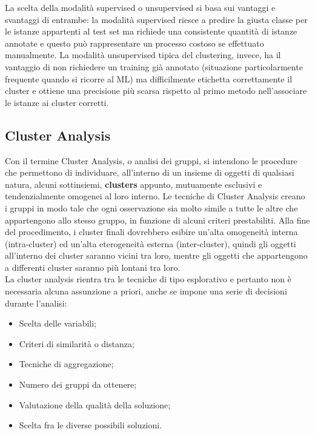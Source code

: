 La scelta della modalità supervised o unsupervised si basa sui vantaggi e svantaggi di entrambe: la modalità supervised riesce a predire la giusta classe per le istanze appartenti al test set ma richiede una consistente quantità di istanze annotate e questo può rappresentare un processo costoso se effettuato manualmente. La modalità unsupervised tipica del clustering, invece, ha il vantaggio di non richiedere un training già annotato (situazione particolarmente frequente quando si
ricorre al ML) ma difficilmente etichetta correttamente il cluster e ottiene una precisione più scarsa rispetto al primo metodo nell'associare le istanze ai cluster corretti. 

\subsection{Cluster Analysis}
Con il termine Cluster Analysis, o analisi dei gruppi, si intendono le procedure che permettono di individuare, all'interno di un insieme di oggetti di qualsiasi natura, alcuni sottinsiemi, \textbf{clusters} appunto, mutuamente esclusivi e tendenzialmente omogenei al loro interno. Le tecniche di Cluster Analysis creano i gruppi in modo tale che ogni osservazione sia molto simile a tutte le altre che appartengono allo stesso gruppo, in funzione di alcuni criteri prestabiliti. Alla fine del procedimento, i cluster finali dovrebbero esibire un'alta omogeneità interna (intra-cluster) ed un'alta eterogeneità esterna (inter-cluster), quindi gli oggetti all'interno dei cluster saranno vicini tra loro, mentre gli oggetti che appartengono a differenti cluster saranno più lontani tra loro.\\
La cluster analysis rientra tra le tecniche di tipo esplorativo e pertanto non è necessaria alcuna assunzione a priori, anche se impone una serie di decisioni durante l'analisi:
\begin{itemize}
	\item Scelta delle variabili;
	\item Criteri di similarità o distanza;
	\item Tecniche di aggregazione;
	\item Numero dei gruppi da ottenere;
	\item Valutazione della qualità della soluzione;
	\item Scelta fra le diverse possibili soluzioni.
\end{itemize}
